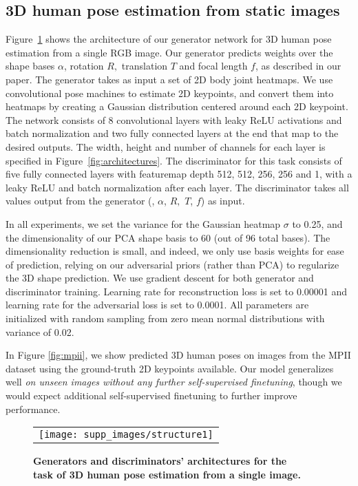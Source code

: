 \documentclass[10pt,twocolumn,letterpaper]{article}
\begin{document}
\subsection{3D human pose estimation from static images}
Figure~\ref{fig:architectures1} shows the architecture of our generator network for 3D human pose estimation from a single  RGB image. Our generator predicts 
weights over the shape bases $\alpha$, rotation $R,$ translation $T$ and focal length $f$, as described in our paper. 
The generator takes as input a set of 2D body joint heatmaps. 
We use convolutional pose machines \cite{wei2016cpm} 
to estimate 2D keypoints, and convert them into heatmaps  by creating a Gaussian distribution  
centered 
around each 2D keypoint. 
The network consists of 8 convolutional layers with leaky ReLU activations and batch normalization and two fully connected layers at the end that map to the desired outputs. The width, height and number of channels for each layer is specified in Figure~\ref{fig:architectures}. 
The discriminator for this task consists of five fully connected layers with featuremap depth 512, 512, 256, 256 and 1, with a leaky ReLU and batch normalization after each layer. The discriminator takes all values output from the generator (\ie, $\alpha$, $R,$ $T$,  $f$) as input. 

In all experiments, we set the variance for the Gaussian heatmap $\sigma$ to 0.25, 
and the dimensionality of our PCA shape basis to 60 (out of 96 total bases). The dimensionality reduction is small, and indeed, we only use basis weights for ease of prediction, relying on our adversarial priors (rather than PCA) to regularize the 3D shape prediction. We use gradient descent for both generator and discriminator training. Learning rate for reconstruction loss is set to 0.00001  and learning rate for the adversarial loss is set to 0.0001. All parameters are initialized with random sampling from zero mean normal distributions with variance of 0.02.

In Figure \ref{fig:mpii}, we show predicted 3D human poses on  images from the MPII dataset \cite{andriluka14cvpr} using the ground-truth 2D keypoints available. Our model generalizes well \textit{on unseen  images without any further self-supervised finetuning}, though we would expect  additional self-supervised finetuning to further improve performance. 
\begin{figure}[t]
    \begin{tabular}{l}
    \texttt{[image: supp\_images/structure1]} \\
    \end{tabular}
\centering
    \label{fig:architectures1}
    \caption{\textbf{Generators and discriminators' architectures for the \\task of 3D human pose estimation from a single image.}}
\end{figure}
\end{document}
